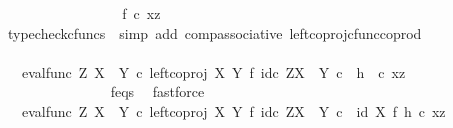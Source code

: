 \begin{isabellebody}
\ \ \ \ \ \ \ \ \ \ \ \ \isamarkupfalse%
\ \isamarkupfalse%
\ {\isachardoublequoteopen}{\isachardot}{\kern0pt}{\isachardot}{\kern0pt}{\isachardot}{\kern0pt}\ {\isacharequal}{\kern0pt}\ f\isactrlsup {\isasymflat}\ {\isasymcirc}\isactrlsub c\ {\isasymlangle}x{\isacharcomma}{\kern0pt}z{\isasymrangle}{\isachardoublequoteclose}\isanewline
\ \ \ \ \ \ \ \ \ \ \ \ \ \ \isamarkupfalse%
\ {\isacharparenleft}{\kern0pt}typecheck{\isacharunderscore}{\kern0pt}cfuncs{\isacharcomma}{\kern0pt}\ \ simp\ add{\isacharcolon}{\kern0pt}\ comp{\isacharunderscore}{\kern0pt}associative{}\ left{\isacharunderscore}{\kern0pt}coproj{\isacharunderscore}{\kern0pt}cfunc{\isacharunderscore}{\kern0pt}coprod{\isacharparenright}{\kern0pt}\isanewline
\ \ \ \ \ \ \ \ \ \ \ \ \isamarkupfalse%
\ \isamarkupfalse%
\ {\isachardoublequoteopen}{\isachardot}{\kern0pt}{\isachardot}{\kern0pt}{\isachardot}{\kern0pt}\ {\isacharequal}{\kern0pt}\ {\isacharparenleft}{\kern0pt}{\isacharparenleft}{\kern0pt}eval{\isacharunderscore}{\kern0pt}func\ Z\ {\isacharparenleft}{\kern0pt}X\ {\isasymCoprod}\ Y{\isacharparenright}{\kern0pt}\ {\isasymcirc}\isactrlsub c\ left{\isacharunderscore}{\kern0pt}coproj\ X\ Y\ {\isasymtimes}\isactrlsub f\ id\isactrlsub c\ {\isacharparenleft}{\kern0pt}Z\isactrlbsup {\isacharparenleft}{\kern0pt}X\ {\isasymCoprod}\ Y{\isacharparenright}{\kern0pt}\isactrlesup {\isacharparenright}{\kern0pt}{\isacharparenright}{\kern0pt}\isactrlsup {\isasymsharp}\ {\isasymcirc}\isactrlsub c\ \ h{\isacharparenright}{\kern0pt}\isactrlsup {\isasymflat}\ \ {\isasymcirc}\isactrlsub c\ {\isasymlangle}x{\isacharcomma}{\kern0pt}z{\isasymrangle}{\isachardoublequoteclose}\isanewline
\ \ \ \ \ \ \ \ \ \ \ \ \ \ \isamarkupfalse%
\ f{\isacharunderscore}{\kern0pt}eqs\ \isamarkupfalse%
\ fastforce\isanewline
\ \ \ \ \ \ \ \ \ \ \ \ \isamarkupfalse%
\ \isamarkupfalse%
\ {\isachardoublequoteopen}{\isachardot}{\kern0pt}{\isachardot}{\kern0pt}{\isachardot}{\kern0pt}\ {\isacharequal}{\kern0pt}\ {\isacharparenleft}{\kern0pt}{\isacharparenleft}{\kern0pt}{\isacharparenleft}{\kern0pt}eval{\isacharunderscore}{\kern0pt}func\ Z\ {\isacharparenleft}{\kern0pt}X\ {\isasymCoprod}\ Y{\isacharparenright}{\kern0pt}\ {\isasymcirc}\isactrlsub c\ left{\isacharunderscore}{\kern0pt}coproj\ X\ Y\ {\isasymtimes}\isactrlsub f\ id\isactrlsub c\ {\isacharparenleft}{\kern0pt}Z\isactrlbsup {\isacharparenleft}{\kern0pt}X\ {\isasymCoprod}\ Y{\isacharparenright}{\kern0pt}\isactrlesup {\isacharparenright}{\kern0pt}{\isacharparenright}{\kern0pt}\isactrlsup {\isasymsharp}\isactrlsup {\isasymflat}{\isacharparenright}{\kern0pt}\ {\isasymcirc}\isactrlsub c\ \ {\isacharparenleft}{\kern0pt}id\ X\ {\isasymtimes}\isactrlsub f\ h{\isacharparenright}{\kern0pt}{\isacharparenright}{\kern0pt}\ {\isasymcirc}\isactrlsub c\ {\isasymlangle}x{\isacharcomma}{\kern0pt}z{\isasymrangle}{\isachardoublequoteclose}\isanewline

\end{isabellebody}
